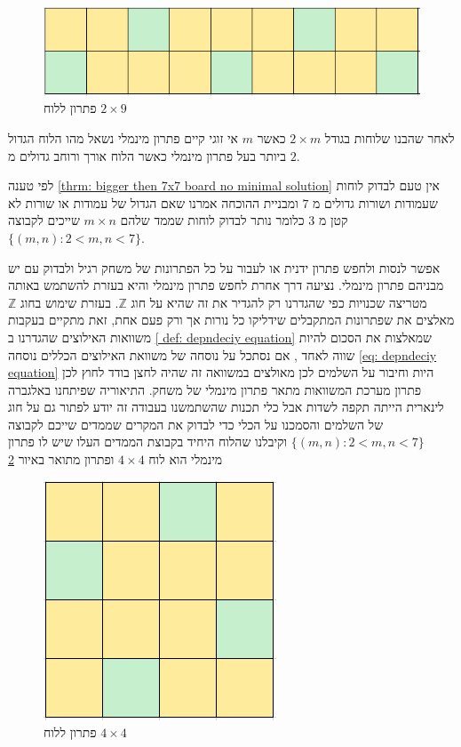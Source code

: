 \documentclass[12pt,leqno]{article}
\begin{document}
\begin{figure}[ht]
    \caption{פתרון ללוח 
    $2 \times 9$}
    \label{fig: 2x9 have min sol}
    \centering
    \includegraphics[width=.7\textwidth,height=.7\textheight,keepaspectratio]{images/2xm_sol.PNG}
\end{figure}

לאחר שהבנו שלוחות בגודל 
$2 \times m$
כאשר 
$m$
אי זוגי 
קיים פתרון מינמלי נשאל מהו הלוח 
הגדול ביותר
בעל פתרון מינמלי כאשר 
הלוח אורך ורוחב גדולים מ
$2$.

לפי טענה 
\ref{thrm: bigger then 7x7 board no minimal solution} 
אין טעם לבדוק לוחות שעמודות ושורות גדולים מ
$7$
ומבניית ההוכחה 
אמרנו שאם 
הגדול של עמודות או שורות לא קטן
מ
$3$
כלומר נותר לבדוק לוחות שממד שלהם 
$m \times n$
שייכים לקבוצה
$\{ (m,n) : 2 < m,n <7 \}$.

אפשר לנסות ולחפש פתרון ידנית
או לעבור על כל הפתרונות של משחק רגיל ולבדוק עם יש מבניהם פתרון 
מינמלי.
נציעה דרך אחרת לחפש פתרון 
מינמלי
והיא בעזרת להשתמש באותה מטריצה שכנויות כפי שהגדרנו רק להגדיר 
את זה שהיא על חוג 
$\mathbb{Z}$.
בעזרת שימוש בחוג 
$\mathbb{Z}$
מאלצים את שפתרונות המתקבלים
שידליקו כל נורות אך ורק פעם אחת,
זאת מתקיים בעקבות 
משוואות האילוצים שהגדרנו ב
\ref{ def: depndeciy equation}
שמאלצות את הסכום להיות שווה לאחד
,
אם נסתכל על נוסחה של משוואת האילוצים הכללים 
נוסחה
\ref{eq: depndeciy equation}
היות וחיבור על השלמים לכן 
מאולצים במשוואה זה שהיה לחצן בודד לחוץ 
לכן פתרון מערכת המשוואות מתאר פתרון 
מינמלי של משחק.
התיאוריה שפיתחנו באלגברה לינארית הייתה תקפה לשדות 
אבל כלי תכנות שהשתמשנו
בעבודה זה יודע לפתור גם על חוג של השלמים 
והסמכנו על הכלי כדי לבדוק את המקרים
שממדים שייכם לקבוצה 
$\{ (m,n) : 2 < m,n <7 \}$
וקיבלנו שהלוח
היחיד בקבוצת הממדים העלו שיש לו פתרון מינמלי 
הוא
לוח 
$4 \times 4$
ופתרון מתואר באיור 
\ref{fig:4x4_have_min_sol}

\begin{figure}[ht]
    \caption{פתרון ללוח 
    $4 \times 4$}
    \label{fig:4x4_have_min_sol}
    \centering
    \includegraphics[width=.5\textwidth,height=.5\textheight,keepaspectratio]{images/4x4_min_sol.PNG}
\end{figure}
\end{document}
